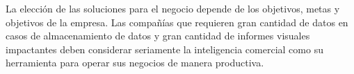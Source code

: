 \documentclass[preprint,12pt]{elsarticle}
\begin{document}
	
	La elección de las soluciones para el negocio depende de los objetivos, metas y objetivos de la empresa. Las compañías que requieren gran cantidad de datos en casos de almacenamiento de datos y gran cantidad de informes visuales impactantes deben considerar seriamente la inteligencia comercial como su herramienta para operar sus negocios de manera productiva.
	\newpage
	
	
	
	
	
	
	
	
	
	
	
	
	
	
\end{document}
